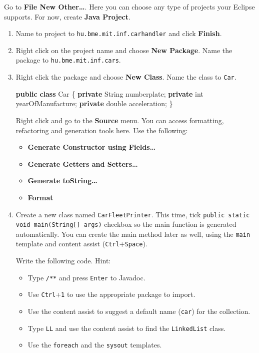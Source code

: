 \documentclass[]{report}
\newenvironment{Shaded}{}{}
\newcommand{\KeywordTok}[1]{\textcolor[rgb]{0.00,0.44,0.13}{\textbf{{#1}}}}
\newcommand{\DataTypeTok}[1]{\textcolor[rgb]{0.56,0.13,0.00}{{#1}}}
\newcommand{\NormalTok}[1]{{#1}}
\begin{document}
Go to \textbf{File \textbar{} New \textbar{} Other\ldots{}}. Here you
can choose any type of projects your Eclipse supports. For now, create
\textbf{Java Project}.

\begin{enumerate}
\def\labelenumi{\arabic{enumi}.}
\item
  Name to project to \texttt{hu.bme.mit.inf.carhandler} and click
  \textbf{Finish}.
\item
  Right click on the project name and choose \textbf{New \textbar{}
  Package}. Name the package to \texttt{hu.bme.mit.inf.cars}.
\item
  Right click the package and choose \textbf{New \textbar{} Class}. Name
  the class to \texttt{Car}.

\begin{Shaded}
\begin{Highlighting}[]
\KeywordTok{public} \KeywordTok{class} \NormalTok{Car \{}
     \KeywordTok{private} \NormalTok{String numberplate;}
     \KeywordTok{private} \DataTypeTok{int} \NormalTok{yearOfManufacture;}
     \KeywordTok{private} \DataTypeTok{double} \NormalTok{acceleration;}
\NormalTok{\}}
\end{Highlighting}
\end{Shaded}

  Right click and go to the \textbf{Source} menu. You can access
  formatting, refactoring and generation tools here. Use the following:

  \begin{itemize}
  \itemsep1pt\parskip0pt
  \item
    \textbf{Generate Constructor using Fields\ldots{}}
  \item
    \textbf{Generate Getters and Setters\ldots{}}
  \item
    \textbf{Generate toString\ldots{}}
  \item
    \textbf{Format}
  \end{itemize}
\item
  Create a new class named \texttt{CarFleetPrinter}. This time, tick
  \texttt{public static void main(String{[}{]} args)} checkbox so the
  main function is generated automatically. You can create the main
  method later as well, using the \texttt{main} template and content
  assist (\texttt{Ctrl}+\texttt{Space}).

  Write the following code. Hint:

  \begin{itemize}
  \itemsep1pt\parskip0pt
  \item
    Type \texttt{/**} and press \texttt{Enter} to Javadoc.
  \item
    Use \texttt{Ctrl}+\texttt{1} to use the appropriate package to
    import.
  \item
    Use the content assist to suggest a default name (\texttt{car}) for
    the collection.
  \item
    Type \texttt{LL} and use the content assist to find the
    \texttt{LinkedList} class.
  \item
    Use the \texttt{foreach} and the \texttt{sysout} templates.
  \end{itemize}


\end{enumerate}
\end{document}
